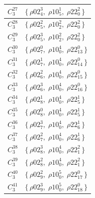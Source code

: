 \begin{longtable}{|c|l|}
  $C_{3}^{27}$ &
  $\{\, \rho02_{4}^{3},\; \rho10_{5}^{1},\; \rho22_{0}^{2} \,\}$ \\
  \hline

  $C_{3}^{28}$ &
  $\{\, \rho02_{5}^{2},\; \rho10_{2}^{2},\; \rho22_{0}^{2} \,\}$ \\
  \hline

  $C_{3}^{29}$ &
  $\{\, \rho02_{5}^{3},\; \rho10_{2}^{2},\; \rho22_{0}^{2} \,\}$ \\
  \hline

  $C_{3}^{30}$ &
  $\{\, \rho02_{7}^{0},\; \rho10_{0}^{4},\; \rho22_{13}^{0} \,\}$ \\
  \hline

  $C_{3}^{31}$ &
  $\{\, \rho02_{7}^{1},\; \rho10_{0}^{4},\; \rho22_{14}^{0} \,\}$ \\
  \hline

  $C_{3}^{32}$ &
  $\{\, \rho02_{6}^{2},\; \rho10_{0}^{4},\; \rho22_{15}^{0} \,\}$ \\
  \hline

  $C_{3}^{33}$ &
  $\{\, \rho02_{6}^{3},\; \rho10_{0}^{4},\; \rho22_{16}^{0} \,\}$ \\
  \hline

  $C_{3}^{34}$ &
  $\{\, \rho02_{8}^{1},\; \rho10_{0}^{4},\; \rho22_{5}^{1} \,\}$ \\
  \hline

  $C_{3}^{35}$ &
  $\{\, \rho02_{8}^{0},\; \rho10_{0}^{4},\; \rho22_{5}^{1} \,\}$ \\
  \hline

  $C_{3}^{36}$ &
  $\{\, \rho02_{7}^{3},\; \rho10_{0}^{4},\; \rho22_{6}^{1} \,\}$ \\
  \hline

  $C_{3}^{37}$ &
  $\{\, \rho02_{7}^{2},\; \rho10_{0}^{4},\; \rho22_{6}^{1} \,\}$ \\
  \hline

  $C_{3}^{38}$ &
  $\{\, \rho02_{8}^{3},\; \rho10_{0}^{4},\; \rho22_{1}^{2} \,\}$ \\
  \hline

  $C_{3}^{39}$ &
  $\{\, \rho02_{8}^{2},\; \rho10_{0}^{4},\; \rho22_{1}^{2} \,\}$ \\
  \hline

  $C_{3}^{40}$ &
  $\{\, \rho02_{9}^{2},\; \rho10_{0}^{5},\; \rho22_{17}^{0} \,\}$ \\
  \hline

  $C_{3}^{41}$ &
  $\{\, \rho02_{9}^{3},\; \rho10_{0}^{5},\; \rho22_{18}^{0} \,\}$ \\
  \hline


\end{longtable}
